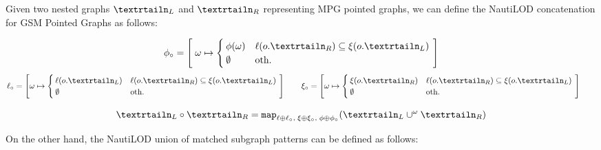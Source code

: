 \begin{definition}
Given two nested graphs $\nested_L$ and $\nested_R$ representing MPG pointed graphs, we can define the NautiLOD  concatenation for GSM  Pointed Graphs as follows:

\[\phi_{\circ} = \left[\;\omega\mapsto \begin{cases}
\phi(\omega) & \ell(o.\nested_R)\subseteq\xi(o.\nested_L)\\
\emptyset & \textup{oth.}\\
\end{cases}\;\right]\]
\[\ell_\circ = \left[\omega\mapsto\begin{cases}
\ell(o.\nested_L) & \ell(o.\nested_R)\subseteq\xi(o.\nested_L) \\
\emptyset & \textup{oth.} \\
\end{cases}\;\right]\qquad \xi_\circ = \left[\omega\mapsto\begin{cases}
\xi(o.\nested_R) & \ell(o.\nested_R)\subseteq\xi(o.\nested_L) \\
\emptyset & \textup{oth.} \\
\end{cases}\;\right]\qquad\]


\[\nested_L \circ \nested_R = \texttt{map}_{\ell\oplus \ell_\circ,\;\xi\oplus \xi_\circ,\;\phi\oplus \phi_\circ}(\nested_L \cup^\omega \nested_R)\] 
\end{definition}

On the other hand, the NautiLOD union of matched subgraph patterns can be defined as follows:

